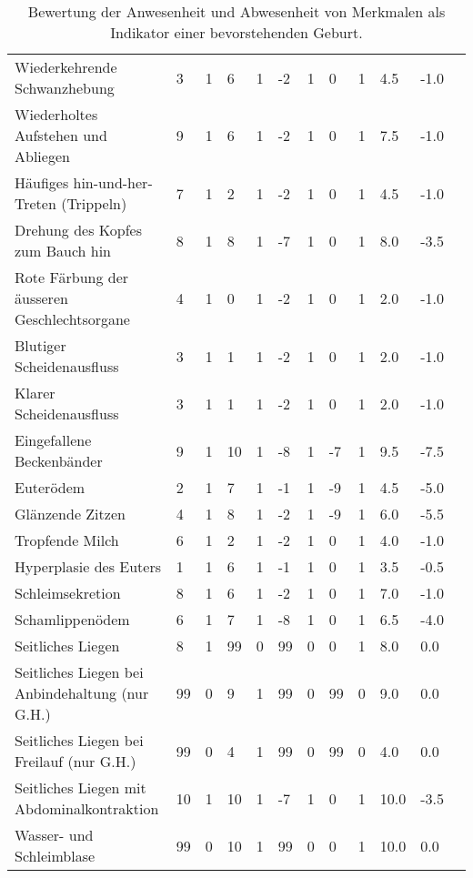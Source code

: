 \begin{landscape}
\begin{table}[h]
\begin{tabular}{  p{8.5cm}  l*{10}{l}}
Wiederkehrende Schwanzhebung & 3 & 1 & 6 & 1 & -2 & 1 & 0 & 1 & 4.5 & -1.0 \\ 
Wiederholtes Aufstehen und Abliegen & 9 & 1 & 6 & 1 & -2 & 1 & 0 & 1 & 7.5 & -1.0 \\ 
Häufiges hin-und-her-Treten (Trippeln) & 7 & 1 & 2 & 1 & -2 & 1 & 0 & 1 & 4.5 & -1.0 \\ 
Drehung des Kopfes zum Bauch hin & 8 & 1 & 8 & 1 & -7 & 1 & 0 & 1 & 8.0 & -3.5 \\ 
Rote Färbung der äusseren Geschlechtsorgane & 4 & 1 & 0 & 1 & -2 & 1 & 0 & 1 & 2.0 & -1.0 \\ 
Blutiger Scheidenausfluss & 3 & 1 & 1 & 1 & -2 & 1 & 0 & 1 & 2.0 & -1.0 \\ 
Klarer Scheidenausfluss & 3 & 1 & 1 & 1 & -2 & 1 & 0 & 1 & 2.0 & -1.0 \\ 
Eingefallene Beckenbänder & 9 & 1 & 10 & 1 & -8 & 1 & -7 & 1 & 9.5 & -7.5 \\ 
Euterödem & 2 & 1 & 7 & 1 & -1 & 1 & -9 & 1 & 4.5 & -5.0 \\ 
Glänzende Zitzen & 4 & 1 & 8 & 1 & -2 & 1 & -9 & 1 & 6.0 & -5.5 \\ 
Tropfende Milch & 6 & 1 & 2 & 1 & -2 & 1 & 0 & 1 & 4.0 & -1.0 \\ 
Hyperplasie des Euters & 1 & 1 & 6 & 1 & -1 & 1 & 0 & 1 & 3.5 & -0.5 \\ 
Schleimsekretion & 8 & 1 & 6 & 1 & -2 & 1 & 0 & 1 & 7.0 & -1.0 \\ 
Schamlippenödem & 6 & 1 & 7 & 1 & -8 & 1 & 0 & 1 & 6.5 & -4.0 \\ 
Seitliches Liegen & 8 & 1 & 99 & 0 & 99 & 0 & 0 & 1 & 8.0 & 0.0 \\ 
Seitliches Liegen bei Anbindehaltung (nur G.H.) & 99 & 0 & 9 & 1 & 99 & 0 & 99 & 0 & 9.0 & 0.0 \\ 
Seitliches Liegen bei Freilauf (nur G.H.) & 99 & 0 & 4 & 1 & 99 & 0 & 99 & 0 & 4.0 & 0.0 \\ 
Seitliches Liegen mit Abdominalkontraktion & 10 & 1 & 10 & 1 & -7 & 1 & 0 & 1 & 10.0 & -3.5 \\ 
Wasser- und Schleimblase & 99 & 0 & 10 & 1 & 99 & 0 & 0 & 1 & 10.0 & 0.0 \\ 
		\bottomrule

	\end{tabular}
	\caption{Bewertung der Anwesenheit und Abwesenheit von Merkmalen als Indikator einer bevorstehenden Geburt. }
	\label{tab: Bewertung der Anwesenheit und Abwesenheit von Merkmalen}
\end{table}

\end{landscape}
\restoregeometry %



